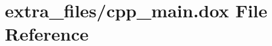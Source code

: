 \hypertarget{cpp__main_8dox}{}\section{extra\+\_\+files/cpp\+\_\+main.dox File Reference}
\label{cpp__main_8dox}
